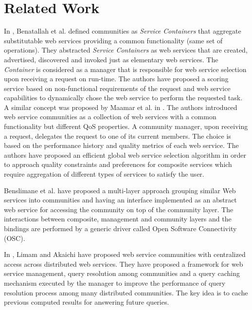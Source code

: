 \documentclass[11pt,onecolumn]{IEEEtran}
\begin{document}
{\section{Related Work}\label{s:related_work}

In \cite{DBLP:journals/internet/BenatallahSD03}, Benatallah et al.
defined communities as \emph{Service Containers} that aggregate
substitutable web services providing a common functionality (same
set of operations). They abstracted \emph{Service Containers} as
web services that are created, advertised, discovered and invoked
just as elementary web services. The \emph{Container} is
considered as a manager that is responsible for web service
selection upon receiving a request on run-time. The authors have
proposed a scoring service based on non-functional requirements of
the request and web service capabilities to dynamically chose the
web service to perform the requested task. A similar concept was
proposed by Maamar et al. in
\cite{DBLP:journals/ijebr/MaamarSTBB09}. The authors introduced
web service communities as a collection of web services with a
common functionality but different QoS properties. A community
manager, upon receiving a request, delegates the request to one of
its current members. The choice is based on the performance
history and quality metrics of each web service. The authors have
proposed an efficient global web service selection algorithm in
order to approach quality constraints and preferences for
composite services which require aggregation of different types of
services to satisfy the user.

Benslimane et al. \cite{Liris-2770} have proposed a multi-layer
approach grouping similar Web services into communities and having
an interface implemented as an abstract web service for accessing
the community on top of the community layer. The interactions
between composite, management and community layers and the
bindings are performed by a generic driver called Open Software
Connectivity (OSC).

In \cite{managing-hela-jalel}, Limam and Akaichi have proposed web
service communities with centralized access across distributed web
services. They have proposed a framework for web service
management, query resolution among communities and a query caching
mechanism executed by the manager to improve the performance of
query resolution process among many distributed communities. The
key idea is to cache previous computed results for answering
future queries.


}
\end{document}
